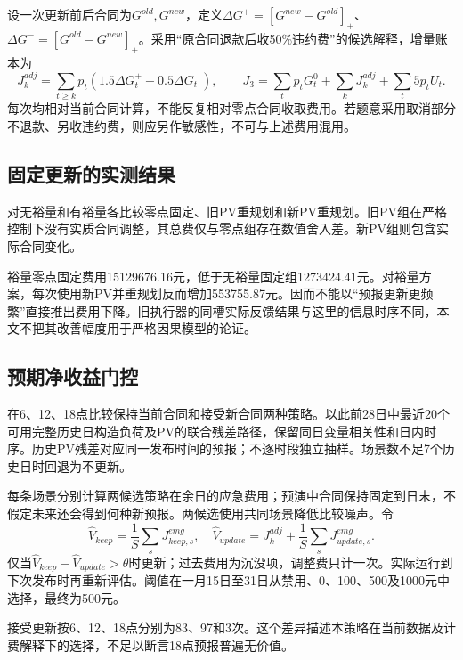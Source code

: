 \documentclass[UTF8,a4paper,zihao=-4,fontset=fandol]{ctexart}
\begin{document}
设一次更新前后合同为$G^{old},G^{new}$，定义$\Delta G^+=[G^{new}-G^{old}]_+$、$\Delta G^-=[G^{old}-G^{new}]_+$。采用“原合同退款后收50\%违约费”的候选解释，增量账本为
\begin{equation}
J^{adj}_k=\sum_{t\ge k}p_t(1.5\Delta G_t^+-0.5\Delta G_t^-),\qquad
J_3=\sum_t p_tG_t^{0}+\sum_kJ^{adj}_k+\sum_t5p_tU_t.
\end{equation}
每次均相对当前合同计算，不能反复相对零点合同收取费用。若题意采用取消部分不退款、另收违约费，则应另作敏感性，不可与上述费用混用。

\subsection{固定更新的实测结果}
对无裕量和有裕量各比较零点固定、旧PV重规划和新PV重规划。旧PV组在严格控制下没有实质合同调整，其总费仅与零点组存在数值舍入差。新PV组则包含实际合同变化。
\begin{table}[H]\centering\caption{第三问334天费用分解（万元）；旧PV组与对应固定组数值相同，正文不重复列示}\small\end{table}

裕量零点固定费用15129676.16元，低于无裕量固定组1273424.41元。对裕量方案，每次使用新PV并重规划反而增加553755.87元。因而不能以“预报更新更频繁”直接推出费用下降。旧执行器的同槽实际反馈结果与这里的信息时序不同，本文不把其改善幅度用于严格因果模型的论证。

\subsection{预期净收益门控}
在6、12、18点比较保持当前合同和接受新合同两种策略。以此前28日中最近20个可用完整历史日构造负荷及PV的联合残差路径，保留同日变量相关性和日内时序。历史PV残差对应同一发布时间的预报；不逐时段独立抽样。场景数不足7个历史日时回退为不更新。

每条场景分别计算两候选策略在余日的应急费用；预演中合同保持固定到日末，不假定未来还会得到何种新预报。两候选使用共同场景降低比较噪声。令
\begin{equation}
\widehat V_{keep}=\frac1S\sum_s J^{emg}_{keep,s},\quad
\widehat V_{update}=J^{adj}_k+\frac1S\sum_sJ^{emg}_{update,s}.
\end{equation}
仅当$\widehat V_{keep}-\widehat V_{update}>\theta$时更新；过去费用为沉没项，调整费只计一次。实际运行到下次发布时再重新评估。阈值在一月15日至31日从禁用、0、100、500及1000元中选择，最终为500元。

接受更新按6、12、18点分别为83、97和3次。这个差异描述本策略在当前数据及计费解释下的选择，不足以断言18点预报普遍无价值。
\end{document}
